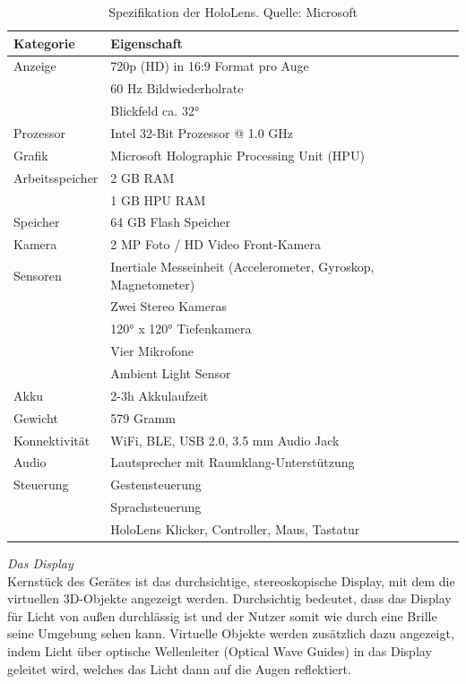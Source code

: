 \bgroup
\setlength\extrarowheight{0pt}
\def\arraystretch{1.25}
\begin{table}[H]
	\centering
	\begin{tabular}{l|l}
		Kategorie & Eigenschaft\\
		\hline
		\hline
		Anzeige & 720p (HD) in 16:9 Format pro Auge\\
		& 60 Hz Bildwiederholrate\\
		& Blickfeld ca. 32°\\
		\hline
		Prozessor & Intel 32-Bit Prozessor @ 1.0 GHz\\
		\hline
		Grafik & Microsoft Holographic Processing Unit (HPU)\\
		\hline
		Arbeitsspeicher & 2 GB RAM\\
		& 1 GB HPU RAM\\
		\hline
		Speicher & 64 GB Flash Speicher\\
		\hline
		Kamera & 2 MP Foto / HD Video Front-Kamera\\
		\hline
		Sensoren & Inertiale Messeinheit (Accelerometer, Gyroskop, Magnetometer) \\
		& Zwei Stereo Kameras\\
		& 120° x 120° Tiefenkamera\\
		& Vier Mikrofone\\
		& Ambient Light Sensor\\
		\hline
		Akku & 2-3h Akkulaufzeit \\
		\hline
		Gewicht & 579 Gramm \\
		\hline
		Konnektivität & WiFi, BLE, USB 2.0, 3.5 mm Audio Jack \\
		\hline
		Audio & Lautsprecher mit Raumklang-Unterstützung\\
		\hline
		Steuerung & Gestensteuerung\\
		& Sprachsteuerung\\
		& HoloLens Klicker, Controller, Maus, Tastatur\\
	\end{tabular}\caption{\label{tab:hololens_tech_details} Spezifikation der HoloLens. Quelle: Microsoft}
\end{table}
\egroup

\vspace{4px}
\textit{Das Display}\\
Kernstück des Gerätes ist das durchsichtige, stereoskopische Display, mit dem die virtuellen 3D-Objekte angezeigt werden. Durchsichtig bedeutet, dass das Display für Licht von außen durchlässig ist und der Nutzer somit wie durch eine Brille seine Umgebung sehen kann. Virtuelle Objekte werden zusätzlich dazu angezeigt, indem Licht über optische Wellenleiter (Optical Wave Guides) in das Display geleitet wird, welches das Licht dann auf die Augen reflektiert.\\

